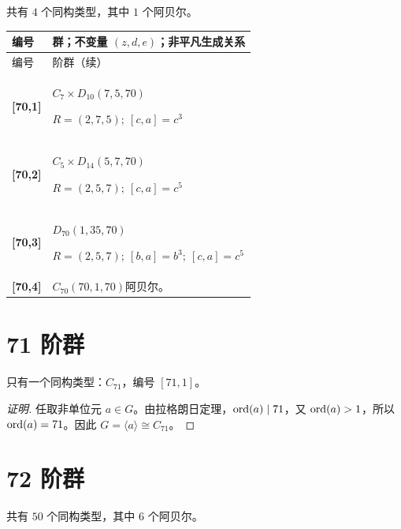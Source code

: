 \documentclass[UTF8,fontset=fandol,11pt,a4paper]{ctexart}
\begin{document}
共有 $4$ 个同构类型，其中 $1$ 个阿贝尔。

\begingroup\small\setlength{\tabcolsep}{3pt}\renewcommand{\arraystretch}{1.12}

\begin{longtable}{@{}p{17mm}>{\raggedright\arraybackslash}p{141mm}@{}}

\toprule 编号 & 群；不变量 $(z,d,e)$；非平凡生成关系\\\midrule\endfirsthead

\toprule 编号 & 70 阶群（续）\\\midrule\endhead\bottomrule\endfoot

\textbf{[70,1]} & $C_{7}\times D_{10}$\quad $(7,5,70)$\par\(R=(2,7,5);\allowbreak\ [c,a]=c^{3}\)\\[3pt]

\textbf{[70,2]} & $C_{5}\times D_{14}$\quad $(5,7,70)$\par\(R=(2,5,7);\allowbreak\ [c,a]=c^{5}\)\\[3pt]

\textbf{[70,3]} & $D_{70}$\quad $(1,35,70)$\par\(R=(2,5,7);\allowbreak\ [b,a]=b^{3};\allowbreak\ [c,a]=c^{5}\)\\[3pt]

\textbf{[70,4]} & $C_{70}$\quad $(70,1,70)$\quad 阿贝尔。\\[3pt]

\end{longtable}\endgroup

\section*{71 阶群}\label{order:71}

只有一个同构类型：$C_{71}$，编号 $[71,1]$。

\begin{proof}[证明]
任取非单位元 $a\in G$。由拉格朗日定理，$\operatorname{ord}(a)\mid 71$，又 $\operatorname{ord}(a)>1$，所以 $\operatorname{ord}(a)=71$。因此 $G=\langle a\rangle\cong C_{71}$。
\end{proof}

\section*{72 阶群}\label{order:72}

共有 $50$ 个同构类型，其中 $6$ 个阿贝尔。
\end{document}
